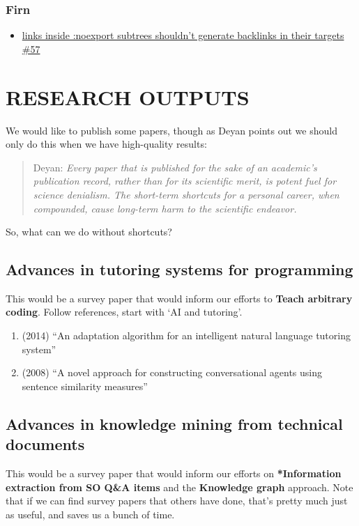 \documentclass[11pt]{article}
\begin{document}
\subsubsection{Firn}
\label{sec:org38ea91f}

\begin{itemize}
\item \href{https://github.com/theiceshelf/firn/issues/57}{links inside :noexport subtrees shouldn't generate backlinks in their targets \#57}
\end{itemize}
\section{RESEARCH OUTPUTS}
\label{sec:org1fefdc5}
We would like to publish some papers, though as Deyan points out we
should only do this when we have high-quality results:

\begin{quote}
Deyan: \emph{Every paper that is published for the sake of an academic's publication record, rather than for its scientific merit, is potent fuel for science denialism. The short-term shortcuts for a personal career, when compounded, cause long-term harm to the scientific endeavor.}
\end{quote}

So, what can we do without shortcuts?

\subsection{Advances in tutoring systems for programming}
\label{sec:orga327049}
This would be a survey paper that would inform our efforts to \textbf{Teach arbitrary coding}.
Follow references, start with ‘AI and tutoring’.

\begin{enumerate}
\item (2014) ``An adaptation algorithm for an intelligent natural language tutoring system''
\item (2008) ``A novel approach for constructing conversational agents using sentence similarity measures''
\end{enumerate}
\subsection{Advances in knowledge mining from technical documents}
\label{sec:orgc3cfd2a}
This would be a survey paper that would inform our efforts on
\textbf{*Information extraction from SO Q\&A items} and the \textbf{Knowledge graph}
approach.  Note that if we can find survey papers that others have
done, that’s pretty much just as useful, and saves us a bunch of time.
\end{document}
